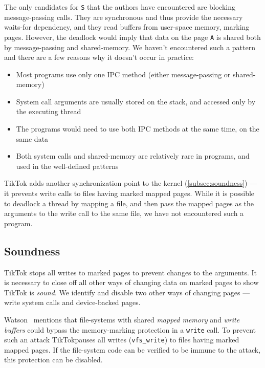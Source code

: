 \documentclass[conference]{IEEEtran}
\newcommand{\sysname}{TikTok}
\begin{document}
The only candidates for \texttt{S} that the authors have encountered are
blocking message-passing calls. They are synchronous and thus provide the
necessary waits-for dependency, and they read buffers from user-space memory,
marking pages. However, the deadlock would imply that data on the page
\texttt{A} is shared both by message-passing and shared-memory. We haven't
encountered such a pattern and there are a few reasons why it doesn't occur in
practice:

\begin{itemize}
  \item Most programs use only one IPC method (either message-passing or
  shared-memory)
  \item System call arguments are usually stored on the stack, and accessed only
  by the executing thread
  \item The programs would need to use both IPC methods at the same time, on the
  same data
  \item Both system calls and shared-memory are relatively rare in programs, and
  used in the well-defined patterns
\end{itemize}

\sysname{} adds another synchronization point to the kernel
(\autoref{subsec:soundness}) --- it prevents write calls to files having marked
mapped pages. While it is possible to deadlock a thread by mapping a file, and
then pass the mapped pages as the arguments to the write call to the same file,
we have not encountered such a program.

\subsection{Soundness}
\label{subsec:soundness}

\sysname{} stops all writes to marked pages to prevent changes to the arguments.
It is necessary to close off all other ways of changing data on marked pages to
show \sysname{} is \emph{sound}. We identify and disable two other ways of
changing pages --- write system calls and device-backed pages.

Watson~\cite{watson2007exploiting} mentions that file-systems with shared
\emph{mapped memory} and \emph{write buffers} could bypass the memory-marking
protection in a \texttt{write} call. To prevent such an attack \sysname pauses
all writes (\texttt{vfs\_write}) to files having marked mapped pages. If the
file-system code can be verified to be immune to the attack, this protection can
be disabled.
\end{document}
